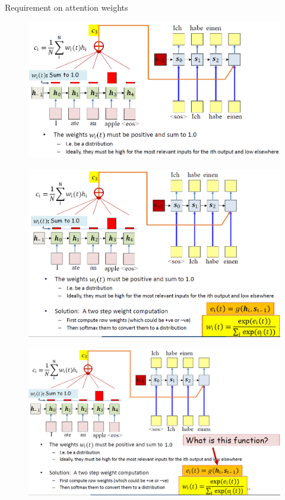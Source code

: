 \begin{frame}[allowframebreaks]{Requirement on attention weights}
    \begin{figure}
        \centering
        \includegraphics[width=\textwidth]{images/attention/attention-3.png}
    \end{figure}
\framebreak
    \begin{figure}
        \centering
        \includegraphics[width=\textwidth]{images/attention/attention-4.png}
    \end{figure}
\framebreak
    \begin{figure}
        \centering
        \includegraphics[width=\textwidth]{images/attention/attention-5.png}
    \end{figure}
\end{frame}

